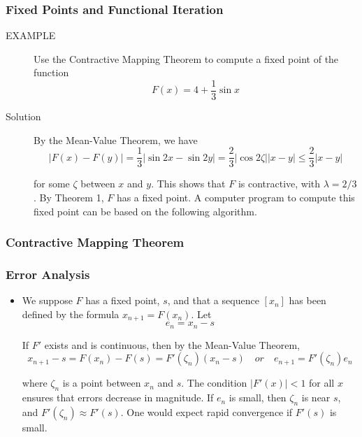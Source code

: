 \documentclass[notheorems,mathserif,table,compress]{beamer}  %
\begin{document}
\begin{frame}
\frametitle{Fixed Points and Functional Iteration}
\begin{description}
\item[EXAMPLE] Use the Contractive Mapping Theorem to compute a fixed point of the function
\begin{displaymath}
F(x)=4+\frac{1}{3}\sin x
\end{displaymath}

\end{description}
\begin{description}
\item[Solution] By the Mean-Value Theorem, we have
\begin{displaymath}
|F(x)-F(y)|=\frac{1}{3}|\sin 2x-\sin 2y|=\frac{2}{3}|\cos 2\zeta||x-y|\leq\frac{2}{3}|x-y|
\end{displaymath}

for some $\zeta$ between $x$ and $y$. This shows that $F$ is contractive, with $\lambda=2/3$. By Theorem 1, $F$ has a fixed point. A computer program to compute this fixed point can be based on the following algorithm.
\end{description}
\end{frame}

\begin{frame}
\frametitle{Contractive Mapping Theorem}

\end{frame}

\begin{frame}
\frametitle{Error Analysis}
\begin{itemize}
\item We suppose $F$ has a fixed point, $s$, and that a sequence $[x_n]$ has been defined by the formula $x_{n+1}=F(x_n)$. Let 
\begin{displaymath}
e_n=x_n-s
\end{displaymath}

If $F'$ exists and is continuous, then by the Mean-Value Theorem,
\begin{displaymath}
x_{n+1}-s=F(x_n)-F(s)=F'({\zeta}_n)(x_n-s)\quad or\quad e_{n+1}=F'({\zeta}_n)e_n
\end{displaymath}

where ${\zeta}_n$ is a point between $x_n$ and $s$. The condition $|F'(x)|<1$ for all $x$ ensures that errors decrease in magnitude. If $e_n$ is small, then ${\zeta}_n$ is near $s$, and $F'({\zeta}_n)\approx F'(s)$. One would expect rapid convergence if $F'(s)$ is small.
\end{itemize}
\end{frame}
\end{document}
